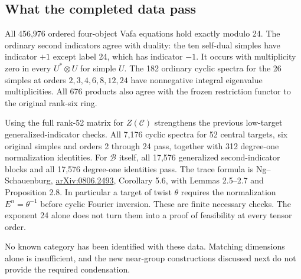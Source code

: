 \documentclass[11pt]{article}
\newcommand{\C}{\mathcal C}
\begin{document}
\subsection{What the completed data pass}

All 456,976 ordered four-object Vafa equations hold exactly modulo 24.
The ordinary second indicators agree with duality: the ten self-dual
simples have indicator $+1$ except label 24, which has indicator $-1$.
It occurs with multiplicity zero in every $U^*\otimes U$ for simple
$U$. The 182 ordinary cyclic spectra for the 26 simples at orders
$2,3,4,6,8,12,24$ have nonnegative integral eigenvalue multiplicities.
All 676 products also agree with the frozen restriction functor to
the original rank-six ring.

Using the full rank-52 matrix for $Z(\C)$ strengthens the previous
low-target generalized-indicator checks. All 7,176 cyclic spectra for
52 central targets, six original simples and orders 2 through 24
pass, together with 312 degree-one normalization identities.
For $\mathcal B$ itself, all 17,576 generalized second-indicator blocks
and all 17,576 degree-one identities pass.
The trace formula is Ng--Schauenburg,
\href{https://arxiv.org/abs/0806.2493}{arXiv:0806.2493},
Corollary 5.6, with Lemmas 2.5--2.7 and Proposition 2.8.
In particular a target of twist $\theta$ requires the normalization
$E^n=\theta^{-1}$ before cyclic Fourier inversion.
These are finite necessary checks. The exponent 24 alone does not
turn them into a proof of feasibility at every tensor order.

No known category has been identified with these data. Matching
dimensions alone is insufficient, and the new near-group constructions
discussed next do not provide the required condensation.


\end{document}
